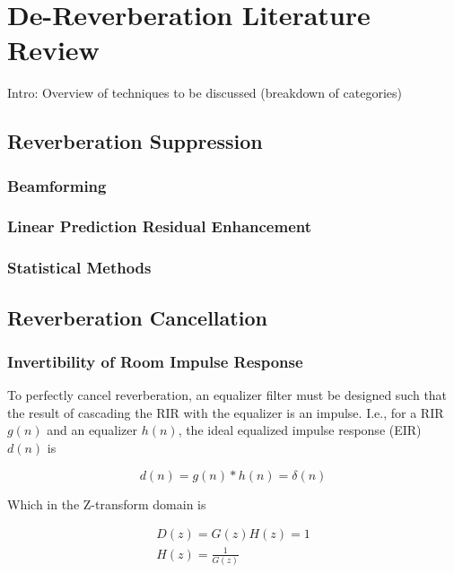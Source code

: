 \chapter{De-Reverberation Literature Review}

Intro: Overview of techniques to be discussed (breakdown of categories)



\section{Reverberation Suppression}
\subsection{Beamforming}
\subsection{Linear Prediction Residual Enhancement}
\subsection{Statistical Methods}

\section{Reverberation Cancellation}
\subsection{Invertibility of Room Impulse Response} \label{RIR_Invertibility}

To perfectly cancel reverberation, an equalizer filter must be designed such that the result of cascading the RIR with the equalizer is an impulse. I.e., for a RIR $g(n)$ and an equalizer $h(n)$, the ideal equalized impulse response (EIR) $d(n)$  is

\begin{equation} 
d(n)=g(n)*h(n)=\delta(n)
\end{equation}

\noindent
Which in the Z-transform domain is

\begin{eqnarray}
D(z)=G(z)H(z)=1	\\
H(z)=\frac{1}{G(z)}
\end{eqnarray}

